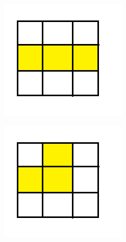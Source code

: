 \documentclass[a4paper,11pt]{kth-mag}
\begin{document}
\begin{figure}[h]
	\centering
	\begin{subfigure}[!b]{0.3\textwidth}
		\includegraphics[width=\textwidth]{figs/step41.png}
	\end{subfigure}
	\begin{subfigure}[!b]{0.3\textwidth}
		\includegraphics[width=\textwidth]{figs/step42.png}

\end{subfigure}
\end{figure}
\end{document}
